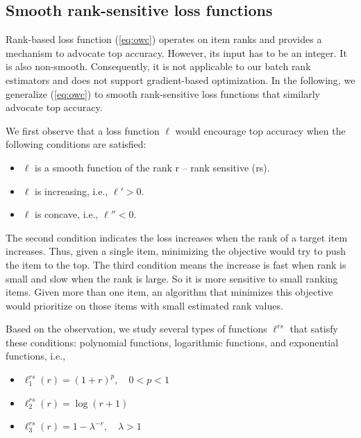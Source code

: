 \documentclass[letterpaper]{article} %
\begin{document}
\subsection{Smooth rank-sensitive loss functions}

Rank-based loss function (\ref{eq:owc}) operates on item ranks and provides a mechanism to advocate top accuracy. However, its input has to be an integer. It is also non-smooth. Consequently, it is not applicable to our batch rank estimators and does not support gradient-based optimization. In the following, we generalize (\ref{eq:owc}) to smooth rank-sensitive loss functions that similarly advocate top accuracy. 

We first observe that a loss function $\ell$ would encourage top accuracy when the following conditions are satisfied:
\begin{itemize}
\item $\ell$ is a smooth function of the rank r -- rank sensitive (rs).
\item $\ell$ is increasing, i.e., $\ell' > 0$.
\item $\ell$ is concave, i.e., $\ell'' < 0$.
\end{itemize}

The second condition indicates the loss increases when the rank of a target item increases. Thus, given a single item, minimizing the objective would try to push the item to the top. The third condition means the increase is fast when rank is small and slow when the rank is large. So it is more sensitive to small ranking items. Given more than one item, an algorithm that minimizes this objective would prioritize on those items with small estimated rank values.

Based on the observation, we study several types of functions $\ell^{rs}$ that satisfy these conditions: polynomial functions, logarithmic functions, and exponential functions, i.e., 
\begin{itemize}
\item $\ell_1^{rs}(r) = (1+r)^p, \quad 0<p<1$
\item $\ell_2^{rs}(r) = \log(r+1)$ 
\item $\ell_3^{rs}(r) = 1 - \lambda^{-r}, \quad \lambda > 1$
\end{itemize}
\end{document}
